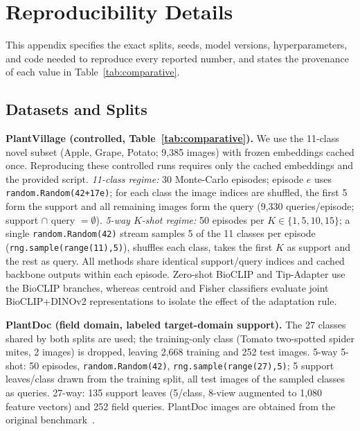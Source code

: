 \documentclass[preprint,12pt]{elsarticle}
\begin{document}
\appendix
\section{Reproducibility Details}
\label{app:repro}
This appendix specifies the exact splits, seeds, model versions, hyperparameters, and code needed to reproduce every reported number, and states the provenance of each value in Table~\ref{tab:comparative}.

\subsection{Datasets and Splits}
\textbf{PlantVillage (controlled, Table~\ref{tab:comparative}).} We use the 11-class novel subset (Apple, Grape, Potato; 9{,}385 images) with frozen embeddings cached once. Reproducing these controlled runs requires only the cached embeddings and the provided script. \emph{11-class regime:} 30 Monte-Carlo episodes; episode $e$ uses \texttt{random.Random(42+17e)}; for each class the image indices are shuffled, the first 5 form the support and all remaining images form the query (9{,}330 queries/episode; support $\cap$ query $=\emptyset$). \emph{5-way $K$-shot regime:} 50 episodes per $K\in\{1,5,10,15\}$; a single \texttt{random.Random(42)} stream samples 5 of the 11 classes per episode (\texttt{rng.sample(range(11),5)}), shuffles each class, takes the first $K$ as support and the rest as query. All methods share identical support/query indices and cached backbone outputs within each episode. Zero-shot BioCLIP and Tip-Adapter use the BioCLIP branches, whereas centroid and Fisher classifiers evaluate joint BioCLIP+DINOv2 representations to isolate the effect of the adaptation rule.

\textbf{PlantDoc (field domain, labeled target-domain support).} The 27 classes shared by both splits are used; the training-only class (Tomato two-spotted spider mites, 2 images) is dropped, leaving 2{,}668 training and 252 test images. 5-way 5-shot: 50 episodes, \texttt{random.Random(42)}, \texttt{rng.sample(range(27),5)}; 5 support leaves/class drawn from the training split, all test images of the sampled classes as queries. 27-way: 135 support leaves (5/class, 8-view augmented to 1{,}080 feature vectors) and 252 field queries. PlantDoc images are obtained from the original benchmark~\cite{singh2020plantdoc}.
\end{document}
